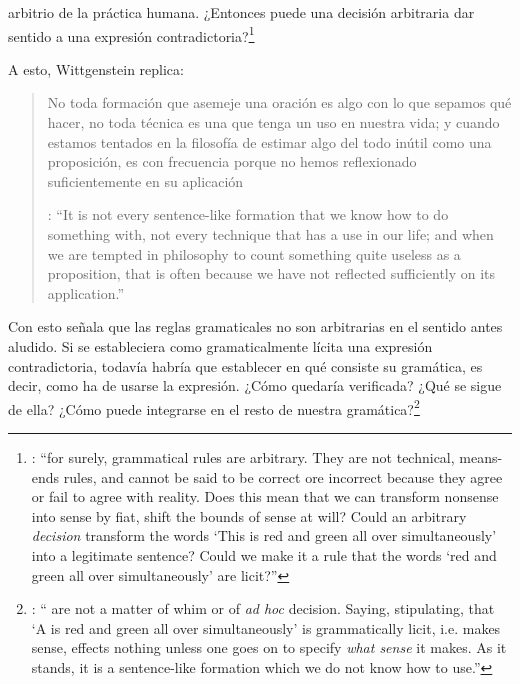 arbitrio de la práctica humana. ¿Entonces puede una decisión arbitraria dar sentido a una expresión contradictoria?\footnote{\cite[Cf.~][216]{hacker2000mind}: \enquote{for surely, grammatical rules are arbitrary. They are not technical, means-ends rules, and cannot be said to be correct ore incorrect because they agree or fail to agree with reality. Does this mean that we can transform nonsense into sense by fiat, shift the bounds of sense at will? Could an arbitrary \emph{decision} transform the words `This is red and green all over simultaneously' into a legitimate sentence? Could we make it a rule that the words `red and green all over simultaneously' are licit?}}

A esto, Wittgenstein replica: \blockquote[{\cite[\S520]{wittgenstein1953phiinv}}: \enquote{It is not every sentence-like formation that we know how to do something with, not every technique that has a use in our life; and when we are tempted in philosophy to count something quite useless as a proposition, that is often because we have not reflected sufficiently on its application.}]{No toda formación que asemeje una oración es algo con lo que sepamos qué hacer, no toda técnica es una que tenga un uso en nuestra vida; y cuando estamos tentados en la filosofía de estimar algo del todo inútil como una proposición, es con frecuencia porque no hemos reflexionado suficientemente en su aplicación}. Con esto señala que las reglas gramaticales no son arbitrarias en el sentido antes aludido. Si se estableciera como gramaticalmente lícita una expresión contradictoria, todavía habría que establecer en qué consiste su gramática, es decir, como ha de usarse la expresión. ¿Cómo quedaría verificada? ¿Qué se sigue de ella? ¿Cómo puede integrarse en el resto de nuestra gramática?\footnote{\cite[Cf.~][216]{hacker2000mind}: \enquote{ are not a matter of whim or of \emph{ad hoc} decision. Saying, stipulating, that `A is red and green all over simultaneously' is grammatically licit, i.e. makes sense, effects nothing unless one goes on to specify \emph{what sense} it makes. As it stands, it is a sentence-like formation which we do not know how to use.}}
